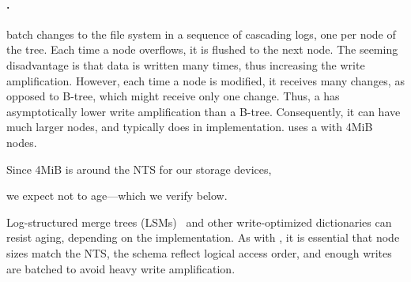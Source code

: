 \paragraph{\bets.}  \bets batch changes to the file system in a sequence of
cascading logs, one per node of the tree.  Each time a node overflows, it is
flushed to the next node.  The seeming disadvantage is that data is written
many times, thus increasing the write amplification.  However, each time a node
is modified, it receives many changes, as opposed to B-tree, which might
receive only one change.  Thus, a \bet has asymptotically lower write
amplification than a B-tree.  Consequently, it can have much larger nodes, and
typically does in implementation.  \betrfs uses a \bet with 4MiB nodes.  

Since 4MiB is around the NTS for our storage devices,

we expect \betrfs not to age---which we verify below. 

Log-structured merge trees (LSMs)~\cite{DBLP:journals/acta/ONeilCGO96} and
other write-optimized dictionaries can resist aging, depending on the
implementation.  As with \bets, it is essential that node sizes match the NTS,
the schema reflect logical access order, and enough writes are batched to avoid
heavy write amplification.  
